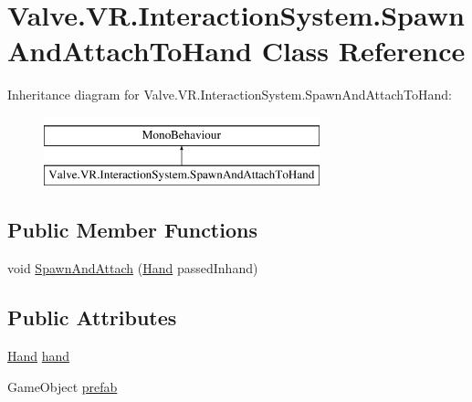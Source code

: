 \hypertarget{class_valve_1_1_v_r_1_1_interaction_system_1_1_spawn_and_attach_to_hand}{}\section{Valve.\+V\+R.\+Interaction\+System.\+Spawn\+And\+Attach\+To\+Hand Class Reference}
\label{class_valve_1_1_v_r_1_1_interaction_system_1_1_spawn_and_attach_to_hand}
Inheritance diagram for Valve.\+V\+R.\+Interaction\+System.\+Spawn\+And\+Attach\+To\+Hand\+:\begin{figure}[H]
\begin{center}
\leavevmode
\includegraphics[height=2.000000cm]{class_valve_1_1_v_r_1_1_interaction_system_1_1_spawn_and_attach_to_hand}
\end{center}
\end{figure}
\subsection*{Public Member Functions}
\begin{DoxyCompactItemize}
\item 
void \mbox{\hyperlink{class_valve_1_1_v_r_1_1_interaction_system_1_1_spawn_and_attach_to_hand_afd22b410b1515636485d1be2eb4c2c7b}{Spawn\+And\+Attach}} (\mbox{\hyperlink{class_valve_1_1_v_r_1_1_interaction_system_1_1_hand}{Hand}} passed\+Inhand)
\end{DoxyCompactItemize}
\subsection*{Public Attributes}
\begin{DoxyCompactItemize}
\item 
\mbox{\hyperlink{class_valve_1_1_v_r_1_1_interaction_system_1_1_hand}{Hand}} \mbox{\hyperlink{class_valve_1_1_v_r_1_1_interaction_system_1_1_spawn_and_attach_to_hand_a7e8a6847b576348cff35507f8b41f293}{hand}}
\item 
Game\+Object \mbox{\hyperlink{class_valve_1_1_v_r_1_1_interaction_system_1_1_spawn_and_attach_to_hand_ae24c05cef1841520e7b839d33afc80aa}{prefab}}
\end{DoxyCompactItemize}


